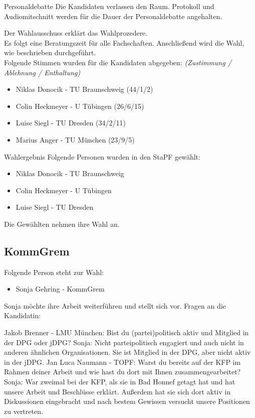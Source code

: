     \begin{info}{Personaldebatte}
      Die Kandidaten verlassen den Raum. Protokoll und Audiomitschnitt werden für die Dauer der Personaldebatte angehalten.
    \end{info}

    Der Wahlausschuss erklärt das Wahlprozedere. \\
    Es folgt eine Beratungszeit für alle Fachschaften. Anschließend wird die Wahl, wie beschrieben durchgeführt. \\

    Folgende Stimmen wurden für die Kandidaten abgegeben: \textit{(Zustimmung /  Ablehnung / Enthaltung)}
    \begin{itemize}
      \item Niklas Donocik - TU Braunschweig  (44/1/2)
      \item Colin Heckmeyer - U Tübingen  (26/6/15)
      \item Luise Siegl - TU Dresden  (34/2/11)
      \item Marius Anger - TU München  (23/9/5)
    \end{itemize}

    \begin{success}{Wahlergebnis}
      Folgende Personen wurden in den StaPF gewählt:
        \begin{itemize}
          \item Niklas Donocik - TU Braunschweig
          \item Colin Heckmeyer - U Tübingen
          \item Luise Siegl - TU Dresden
        \end{itemize}
        \tcblower
        Die Gewählten nehmen ihre Wahl an.
    \end{success}

  \subsection{KommGrem}
    Folgende Person steht zur Wahl:
    \begin{itemize}
      \item Sonja Gehring - KommGrem
    \end{itemize}
    Sonja möchte ihre Arbeit weiterführen und stellt sich vor.
    Fragen an die Kandidatin:
    \begin{outline}
      \1 Jakob Brenner - LMU München: Bist du (partei)politisch aktiv und Mitglied in der DPG oder jDPG?
        \2 Sonja: Nicht parteipolitisch engagiert und auch nicht in anderen ähnlichen Organisationen. Sie ist Mitglied in der DPG, aber nicht aktiv in der jDPG.
      \1 Jan Luca Naumann - TOPF: Warst du bereits auf der KFP im Rahmen deiner Arbeit und wie hast du dort mit Ihnen zusammengearbeitet?
        \2 Sonja: War zweimal bei der KFP, als sie in Bad Honnef getagt hat und hat unsere Arbeit und Beschlüsse erklärt. Außerdem hat sie sich dort aktiv in Diskussionen eingebracht und nach bestem Gewissen versucht unsere Positionen zu vertreten.
    \end{outline}

